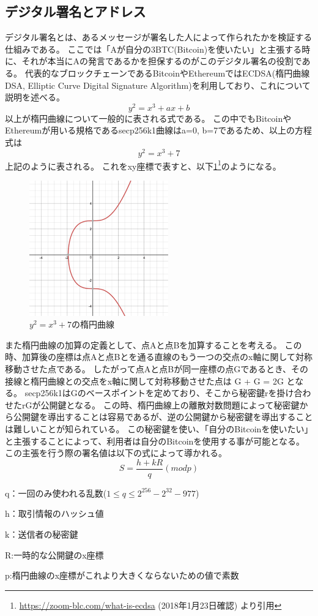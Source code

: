 \subsection{デジタル署名とアドレス}
デジタル署名とは、あるメッセージが署名した人によって作られたかを検証する仕組みである。
ここでは「Aが自分の3BTC(Bitcoin)を使いたい」と主張する時に、それが本当にAの発言であるかを担保するのがこのデジタル署名の役割である。
代表的なブロックチェーンであるBitcoinやEthereumではECDSA(楕円曲線DSA, Elliptic Curve Digital Signature Algorithm)を利用しており、これについて説明を述べる。
\begin{equation}
y^2 = x^3 + ax + b
\end{equation}
以上が楕円曲線について一般的に表される式である。
この中でもBitcoinやEthereumが用いる規格であるsecp256k1曲線はa=0, b=7であるため、以上の方程式は
\begin{equation}
y^2 = x^3 + 7
\end{equation}
上記のように表される。
これをxy座標で表すと、以下\ref{ecdsa2}\footnote{\url{https://zoom-blc.com/what-is-ecdsa} (2018年1月23日確認) より引用}のようになる。
\begin{figure}[htbp]
 \centering
  \includegraphics[width=60mm]{image/ecdsa2.png}
 \caption{$y^2 = x^3 + 7$の楕円曲線}
 \label{ecdsa2}
\end{figure}
また楕円曲線の加算の定義として、点Aと点Bを加算することを考える。
この時、加算後の座標は点Aと点Bとを通る直線のもう一つの交点のx軸に関して対称移動させた点である。
したがって点Aと点Bが同一座標の点Gであるとき、その接線と楕円曲線との交点をx軸に関して対称移動させた点は
G + G = 2G
となる。
secp256k1はGのベースポイントを定めており、そこから秘密鍵rを掛け合わせたrGが公開鍵となる。
この時、楕円曲線上の離散対数問題によって秘密鍵から公開鍵を導出することは容易であるが、逆の公開鍵から秘密鍵を導出することは難しいことが知られている。
この秘密鍵を使い、「自分のBitcoinを使いたい」と主張することによって、利用者は自分のBitcoinを使用する事が可能となる。
この主張を行う際の署名値は以下の式によって導かれる。
\begin{equation}
S=\frac{h+kR}{q}{(mod p)}
\end{equation}
\begin{list}{}{}
\item q：一回のみ使われる乱数(\(1 \leq q \leq 2^256-2^32-977\))
\item h：取引情報のハッシュ値
\item k：送信者の秘密鍵
\item R:一時的な公開鍵のx座標
\item p:楕円曲線のx座標がこれより大きくならないための値で素数
\end{list}

